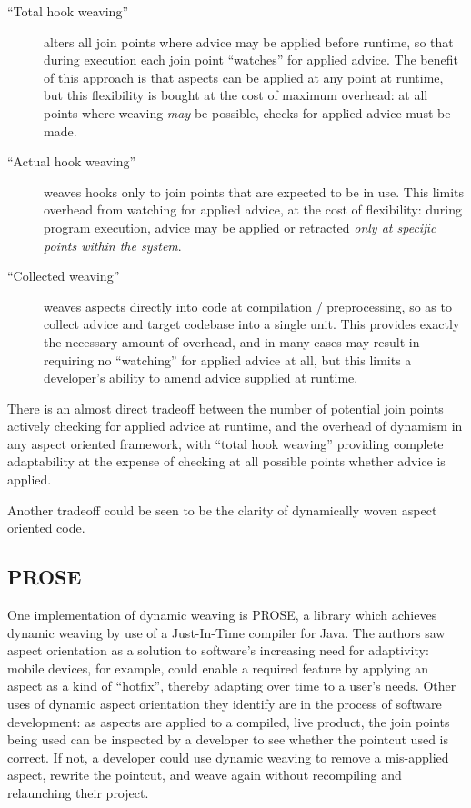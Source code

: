 \begin{description}
    \item[``Total hook weaving''] alters all join points where advice may be
    applied before runtime, so that during execution each join point ``watches''
    for applied advice. The benefit of this approach is that aspects can be
    applied at any point at runtime, but this flexibility is bought at the cost
    of maximum overhead: at all points where weaving \emph{may} be possible,
    checks for applied advice must be made.
    \item[``Actual hook weaving''] weaves hooks only to join points that are
    expected to be in use. This limits overhead from watching for applied
    advice, at the cost of flexibility: during program execution, advice may be
    applied or retracted \emph{only at specific points within the system}.
    \item[``Collected weaving''] weaves aspects directly into code at
    compilation / preprocessing, so as
    to collect advice and target codebase into a single unit. This provides
    exactly the necessary amount of overhead, and in many cases may result in
    requiring no ``watching'' for applied advice at all, but this limits a
    developer's ability to amend advice supplied at runtime.
\end{description}

There is an almost direct tradeoff between the number of potential join points
actively checking for applied advice at runtime, and the overhead of dynamism in
any aspect oriented framework, with ``total hook weaving'' providing complete
adaptability at the expense of checking at all possible points whether advice is
applied.

Another tradeoff could be seen to be the clarity of dynamically woven aspect
oriented code.


\subsection{PROSE}\label{subsec:PROSE} One implementation of dynamic weaving is
PROSE\cite{popovici2002PROSE,popovici2003JITaspects}, a library which achieves
dynamic weaving by use of a Just-In-Time compiler for Java. The authors saw
aspect orientation as a solution to software's increasing need for adaptivity:
mobile devices, for example, could enable a required feature by applying an
aspect as a kind of ``hotfix'', thereby adapting over time to a user's needs.
Other uses of dynamic aspect orientation they identify are in the process of
software development: as aspects are applied to a compiled, live product, the
join points being used can be inspected by a developer to see whether the
pointcut used is correct. If not, a developer could use dynamic weaving to
remove a mis-applied aspect, rewrite the pointcut, and weave again without
recompiling and relaunching their project.

